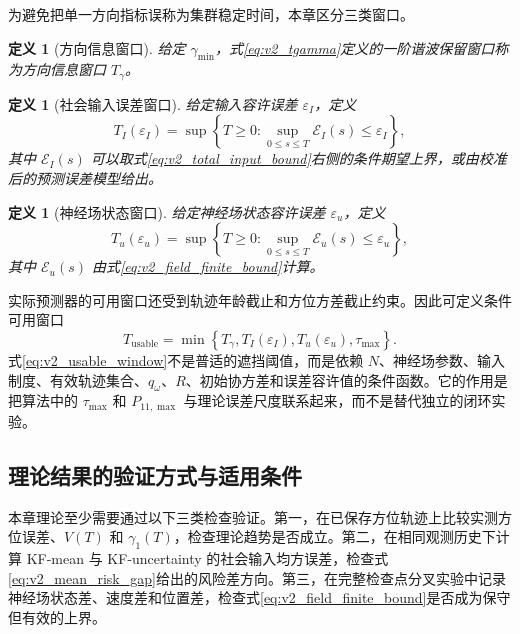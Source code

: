 \documentclass[UTF8,fontset=windows,11pt]{ctexart}
\newtheorem{definition}[theorem]{定义}
\begin{document}
为避免把单一方向指标误称为集群稳定时间，本章区分三类窗口。

\begin{definition}[方向信息窗口]
\label{def:v2_direction_window}
给定 $\gamma_{\min}$，式\eqref{eq:v2_tgamma}定义的一阶谐波保留窗口称为方向信息窗口 $T_\gamma$。
\end{definition}

\begin{definition}[社会输入误差窗口]
\label{def:v2_input_window}
给定输入容许误差 $\varepsilon_I$，定义
\begin{equation}
 T_I(\varepsilon_I)=\sup\left\{T\ge0:
 \sup_{0\le s\le T}\mathcal E_I(s)\le\varepsilon_I\right\},
 \label{eq:v2_input_window}
\end{equation}
其中 $\mathcal E_I(s)$ 可以取式\eqref{eq:v2_total_input_bound}右侧的条件期望上界，或由校准后的预测误差模型给出。
\end{definition}

\begin{definition}[神经场状态窗口]
\label{def:v2_field_window}
给定神经场状态容许误差 $\varepsilon_u$，定义
\begin{equation}
 T_u(\varepsilon_u)=\sup\left\{T\ge0:
 \sup_{0\le s\le T}\mathcal E_u(s)\le\varepsilon_u\right\},
 \label{eq:v2_field_window}
\end{equation}
其中 $\mathcal E_u(s)$ 由式\eqref{eq:v2_field_finite_bound}计算。
\end{definition}

实际预测器的可用窗口还受到轨迹年龄截止和方位方差截止约束。因此可定义条件可用窗口
\begin{equation}
 T_{\mathrm{usable}}
 =\min\left\{T_\gamma,
 T_I(\varepsilon_I),
 T_u(\varepsilon_u),
 \tau_{\max}\right\}.
 \label{eq:v2_usable_window}
\end{equation}
式\eqref{eq:v2_usable_window}不是普适的遮挡阈值，而是依赖 $N$、神经场参数、输入制度、有效轨迹集合、$q_\omega$、$R$、初始协方差和误差容许值的条件函数。它的作用是把算法中的 $\tau_{\max}$ 和 $P_{11,\max}$ 与理论误差尺度联系起来，而不是替代独立的闭环实验。

\subsection{理论结果的验证方式与适用条件}

本章理论至少需要通过以下三类检查验证。第一，在已保存方位轨迹上比较实测方位误差、$V(T)$ 和 $\gamma_1(T)$，检查理论趋势是否成立。第二，在相同观测历史下计算 KF-mean 与 KF-uncertainty 的社会输入均方误差，检查式\eqref{eq:v2_mean_risk_gap}给出的风险差方向。第三，在完整检查点分叉实验中记录神经场状态差、速度差和位置差，检查式\eqref{eq:v2_field_finite_bound}是否成为保守但有效的上界。
\end{document}
